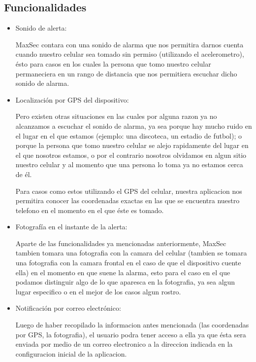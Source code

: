 \documentclass[12pt,letterpaper]{article}
\begin{document}
   \subsection{Funcionalidades}
   \begin{itemize}
   \item Sonido de alerta:
   
   MaxSec contara con una sonido de alarma que nos permitira darnos cuenta cuando nuestro celular sea tomado sin permiso (utilizando el acelerometro), ésto para casos en los cuales la persona que tomo nuestro celular permaneciera en un rango de distancia que nos permitiera escuchar dicho sonido de alarma.
   
   \item Localización por GPS del dispositivo:
   
   Pero existen otras situaciones en las cuales por alguna razon ya no alcanzamos a escuchar el sonido de alarma, ya sea porque hay mucho ruido en el lugar en el que estamos (ejemplo: una discoteca, un estadio de futbol); o porque la persona que tomo nuestro celular se alejo rapidamente del lugar en el que nosotros estamos, o por el contrario nosotros olvidamos en algun sitio nuestro celular y al momento que una persona lo toma ya no estamos cerca de él.
   
   Para casos como estos utilizando el GPS del celular, nuestra aplicacion nos permitira conocer las coordenadas exactas en las que se encuentra nuestro telefono en el momento en el que éste es tomado.
   
   \item Fotografía en el instante de la alerta:
   
   Aparte de las funcionalidades ya mencionadas anteriormente, MaxSec tambien tomara una fotografia con la camara del celular (tambien se tomara una fotografia con la camara frontal en el caso de que el dispositivo cuente ella) en el momento en que suene la alarma, esto para el caso en el que podamos distinguir algo de lo que aparesca en la fotografia, ya sea algun lugar especifico o en el mejor de los casos algun rostro.
   
   \item Notificación por correo electrónico:
   
   Luego de haber recopilado la informacion antes mencionada (las coordenadas por GPS, la fotografia), el usuario podra tener acceso a ella ya que ésta sera enviada por medio de un correo electronico a la direccion indicada en la configuracion inicial de la aplicacion.
   
    
   \end{itemize}
   
\end{document}
